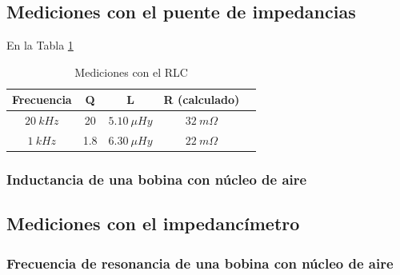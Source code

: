 \documentclass[a4paper,10pt]{article}
\begin{document}
		\subsection{Mediciones con el puente de impedancias}
		En la Tabla \ref{tabPUENTEbobina}
		\begin{table}[!htp]
					\centering
					\begin{tabular}{|c|c|c|c|c|}
						\hline
			    		Frecuencia & Q & L  & R (calculado) \\
						\hline
						$20~kHz$& 20 & $5.10~\mu Hy$ &$ 32~m\Omega$ \\
						\hline
						$1~kHz$& 1.8 & $6.30~\mu Hy$ &$ 22~m\Omega$ \\
						\hline	  
					\end{tabular}
					\caption{Mediciones con el RLC} \label{tabPUENTEbobina}
				\end{table}	
		\subsubsection{Inductancia de una bobina con n\'ucleo de aire}
		
		\subsection{Mediciones con el impedanc\'imetro}
		\subsubsection{Frecuencia de resonancia de una bobina con n\'ucleo de aire}
\end{document}
